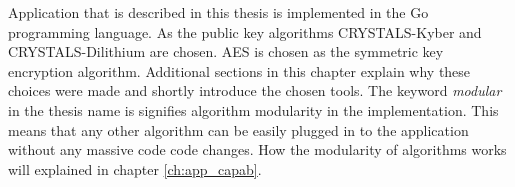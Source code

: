 Application that is described in this thesis is implemented in the Go programming language. As the public key algorithms CRYSTALS-Kyber and CRYSTALS-Dilithium are chosen. AES is chosen as the symmetric key encryption algorithm. Additional sections in this chapter explain why these choices were made and shortly introduce the chosen tools. The keyword \textit{modular} in the thesis name is signifies algorithm modularity in the implementation. This means that any other algorithm can be easily plugged in to the application without any massive code code changes. How the modularity of algorithms works will explained in chapter \ref{ch:app_capab}.